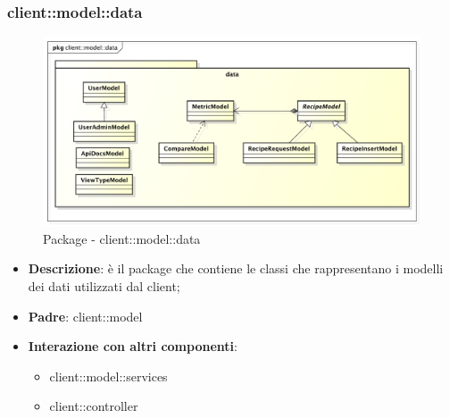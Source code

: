 %

%

\subsubsection{client::model::data} %
\label{ssub:bdsm_app_client_model_data}
\begin{figure}[htbp]
	\centering
	\centerline{\includegraphics[scale=0.5]{./images/client/client_model_data.pdf}}
	\caption{Package - client::model::data}
\end{figure}

\begin{itemize}
	\item \textbf{Descrizione}: è il package che contiene le classi che rappresentano i modelli dei dati utilizzati dal client;
	\item \textbf{Padre}: client::model
	\item \textbf{Interazione con altri componenti}:
		\begin{itemize}
			\item client::model::services
			\item client::controller
		\end{itemize}
\end{itemize}

